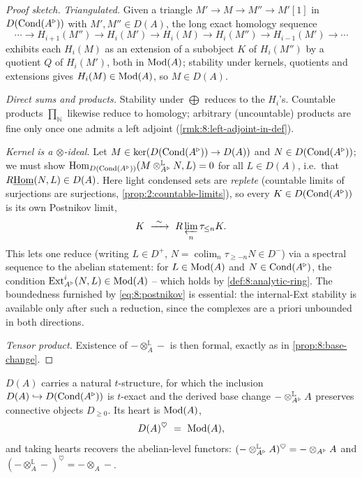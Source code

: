 \begin{proof}[Proof sketch]
\emph{Triangulated.} Given a triangle $M'\to M\to M''\to M'[1]$ in
$D(\operatorname{Cond}(A^{\triangleright}))$ with $M',M''\in D(A)$, the long exact homology sequence
\begin{equation*}
\cdots\to H_{i+1}(M'')\to H_{i}(M')\to H_{i}(M)\to H_{i}(M'')\to H_{i-1}(M')\to\cdots
\end{equation*}
exhibits each $H_{i}(M)$ as an extension of a subobject $K$ of $H_i(M'')$ by a
quotient $Q$ of $H_i(M')$, both in $\operatorname{Mod}(A)$; stability under kernels, quotients
and extensions gives $H_{i}(M)\in\operatorname{Mod}(A)$, so $M\in D(A)$.

\emph{Direct sums and products.} Stability under $\bigoplus$ reduces to the
$H_{i}$'s. Countable products $\prod_{\mathbb{N}}$ likewise reduce to homology;
arbitrary (uncountable) products are fine only once one admits a left adjoint
(\cref{rmk:8:left-adjoint-in-def}).

\emph{Kernel is a $\otimes$-ideal.} Let $M\in\ker(D(\operatorname{Cond}(A^{\triangleright}))\to D(A))$ and
$N\in D(\operatorname{Cond}(A^{\triangleright}))$; we must show $\operatorname{Hom}_{D(\operatorname{Cond}(A^{\triangleright}))}(M\otimes^{\mathbb{L}}
_{A^{\triangleright}}N,L)=0$ for all $L\in D(A)$, i.e.\ that $R\underline{\operatorname{Hom}}(N,L)\in D(A)$. Here light
condensed sets are \emph{replete} (countable limits of surjections are
surjections, \cref{prop:2:countable-limits}), so every $K\in D(\operatorname{Cond}(A^{\triangleright}))$ is
its own Postnikov limit,
\begin{equation}
\label{eq:8:postnikov}
K\ \xrightarrow{\ \sim\ }\ R\varprojlim_{n}\tau_{\le n}K .
\end{equation}
This lets one reduce (writing $L\in D^{+}$, $N=\operatorname*{colim}_{n}\tau_{\ge-n}N
\in D^{-}$) via a spectral sequence to the abelian statement: for $L\in\operatorname{Mod}(A)$
and $N\in\operatorname{Cond}(A^{\triangleright})$, the condition $\operatorname{Ext}^{i}_{A^{\triangleright}}(N,L)\in\operatorname{Mod}(A)$ -- which
holds by \cref{def:8:analytic-ring}. The boundedness furnished by
\eqref{eq:8:postnikov} is essential: the internal-Ext stability is available only
after such a reduction, since the complexes are a priori unbounded in both
directions.

\emph{Tensor product.} Existence of $-\otimes^{\mathbb{L}}_{A}-$ is then formal,
exactly as in \cref{prop:8:base-change}.
\end{proof}

\begin{proposition}
\label{prop:8:t-structure}
$D(A)$ carries a natural $t$-structure, for which the inclusion
$D(A)\hookrightarrow D(\operatorname{Cond}(A^{\triangleright}))$ is $t$-exact and the derived base change
$-\otimes^{\mathbb{L}}_{A^{\triangleright}}A$ preserves connective objects $D_{\ge0}$. Its
heart is $\operatorname{Mod}(A)$,
\begin{equation*}
D(A)^{\heartsuit}\ =\ \operatorname{Mod}(A),
\end{equation*}
and taking hearts recovers the abelian-level functors:
$(-\otimes^{\mathbb{L}}_{A^{\triangleright}}A)^{\heartsuit}=-\otimes_{A^{\triangleright}}A$ and
$(-\otimes^{\mathbb{L}}_{A}-)^{\heartsuit}=-\otimes_{A}-$.
\end{proposition}

